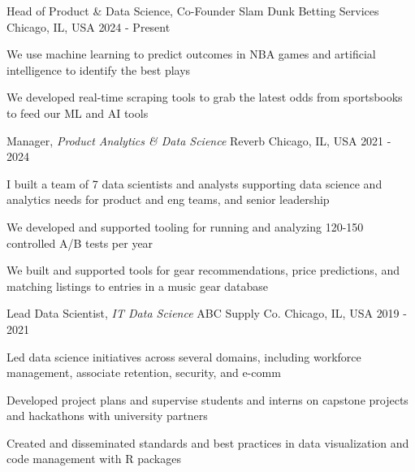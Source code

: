 
\begin{cventries}

  \cventry
    {Head of Product \& Data Science, Co-Founder} %
    {Slam Dunk Betting Services} %
    {Chicago, IL, USA} %
    {2024 - Present} %
    {
      \begin{cvitems}
        \item {We use machine learning to predict outcomes in NBA games and artificial intelligence to identify the best plays}
        \item {We developed real-time scraping tools to grab the latest odds from sportsbooks to feed our ML and AI tools}          
      \end{cvitems}
    }

  \cventry
    {Manager, \textit{Product Analytics \& Data Science}} %
    {Reverb} %
    {Chicago, IL, USA} %
    {2021 - 2024} %
    {
      \begin{cvitems}
        \item {I built a team of 7 data scientists and analysts supporting data science and analytics needs for product and eng teams, and senior leadership}
        \item {We developed and supported tooling for running and analyzing 120-150 controlled A/B tests per year}
        \item {We built and supported tools for gear recommendations, price predictions, and matching listings to entries in a music gear database}  
      \end{cvitems}
    }

  \cventry
    {Lead Data Scientist, \textit{IT Data Science}} %
    {ABC Supply Co.} %
    {Chicago, IL, USA} %
    {2019 - 2021} %
    {
      \begin{cvitems}
        \item {Led data science initiatives across several domains, including workforce management, associate retention, security, and e-comm}
        \item {Developed project plans and supervise students and interns on capstone projects and hackathons with university partners}
        \item {Created and disseminated standards and best practices in data visualization and code management with R packages}
      \end{cvitems}
    }


\end{cventries}
